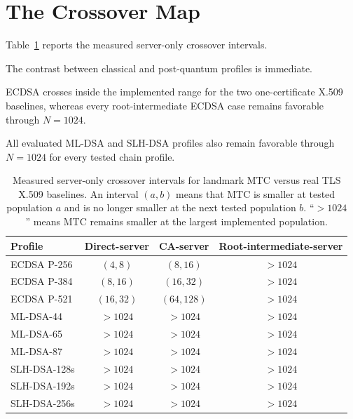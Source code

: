 \documentclass[journal]{IEEEtran}
\begin{document}
\section{The Crossover Map}



Table~\ref{tab:crossover} reports the measured server-only crossover intervals.

The contrast between classical and post-quantum profiles is immediate.

ECDSA crosses inside the implemented range for the two one-certificate X.509 baselines, whereas every root-intermediate ECDSA case remains favorable through $N=1024$.

All evaluated ML-DSA and SLH-DSA profiles also remain favorable through $N=1024$ for every tested chain profile.



\begin{table}[t]

\caption{Measured server-only crossover intervals for landmark MTC versus real TLS X.509 baselines. An interval $(a,b)$ means that MTC is smaller at tested population $a$ and is no longer smaller at the next tested population $b$. ``$>1024$'' means MTC remains smaller at the largest implemented population.}

\label{tab:crossover}

\centering

\begin{tabular}{lccc}

\toprule

\textbf{Profile} & \textbf{Direct-server} & \textbf{CA-server} & \textbf{Root-intermediate-server} \\

\midrule

ECDSA P-256       & $(4,8)$   & $(8,16)$   & $>1024$ \\

ECDSA P-384       & $(8,16)$  & $(16,32)$  & $>1024$ \\

ECDSA P-521       & $(16,32)$ & $(64,128)$ & $>1024$ \\

ML-DSA-44         & $>1024$   & $>1024$    & $>1024$ \\

ML-DSA-65         & $>1024$   & $>1024$    & $>1024$ \\

ML-DSA-87         & $>1024$   & $>1024$    & $>1024$ \\

SLH-DSA-128s      & $>1024$   & $>1024$    & $>1024$ \\

SLH-DSA-192s      & $>1024$   & $>1024$    & $>1024$ \\

SLH-DSA-256s      & $>1024$   & $>1024$    & $>1024$ \\

\bottomrule

\end{tabular}

\end{table}
\end{document}
